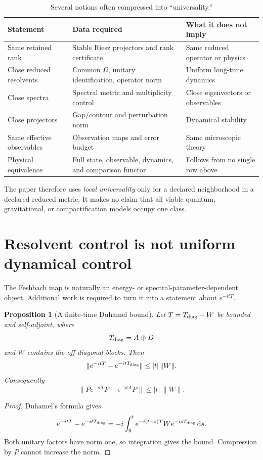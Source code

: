 \documentclass[11pt]{article}
\newtheorem{proposition}[theorem]{Proposition}
\theoremstyle{definition}
\theoremstyle{remark}
\newcommand{\1}{\mathbf 1}
\newcommand{\dd}{\mathrm d}
\begin{document}
\begin{table}[htbp]
\centering
\small
\begin{tabularx}{\textwidth}{L{0.23\textwidth}YY}
\toprule
Statement & Data required & What it does not imply \\
\midrule
Same retained rank
& Stable Riesz projectors and rank certificate
& Same reduced operator or physics \\
Close reduced resolvents
& Common \(\Omega\), unitary identification, operator norm
& Uniform long-time dynamics \\
Close spectra
& Spectral metric and multiplicity control
& Close eigenvectors or observables \\
Close projectors
& Gap/contour and perturbation norm
& Dynamical stability \\
Same effective observables
& Observation maps and error budget
& Same microscopic theory \\
Physical equivalence
& Full state, observable, dynamics, and comparison functor
& Follows from no single row above \\
\bottomrule
\end{tabularx}
\caption{Several notions often compressed into ``universality.''}
\label{tab:universality}
\end{table}

The paper therefore uses \emph{local universality} only for a declared
neighborhood in a declared reduced metric.  It makes no claim that all
viable quantum, gravitational, or compactification models occupy one
class.

\section{Resolvent control is not uniform dynamical control}
\label{sec:dynamics}

The Feshbach map is naturally an energy- or spectral-parameter-dependent
object.  Additional work is required to turn it into a statement about
\(e^{-itT}\).

\begin{proposition}[A finite-time Duhamel bound]
\label{prop:duhamel}
Let \(T=T_{\rm diag}+W\) be bounded and self-adjoint, where
\[
T_{\rm diag}=A\oplus D
\]
and \(W\) contains the off-diagonal blocks.  Then
\[
\|e^{-itT}-e^{-itT_{\rm diag}}\|
\leq |t|\,\|W\|.
\]
Consequently
\[
\|Pe^{-itT}P-e^{-itA}P\|
\leq |t|\,\|W\|.
\]
\end{proposition}

\begin{proof}
Duhamel's formula gives
\[
e^{-itT}-e^{-itT_{\rm diag}}
=
-i\int_0^t
e^{-i(t-s)T}W e^{-isT_{\rm diag}}\,\dd s.
\]
Both unitary factors have norm one, so integration gives the bound.
Compression by \(P\) cannot increase the norm.
\end{proof}
\end{document}
